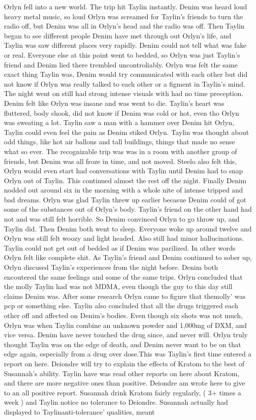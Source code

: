 \documentclass[12pt]{book}
\begin{document}
Orlyn fell into a new world. The trip hit Taylin instantly. Denim was heard loud heavy metal music, so loud Orlyn was screamed for Taylin's friends to turn the radio off, but Denim was all in Orlyn's head and the radio was off. Then Taylin began to see different people Denim have met through out Orlyn's life, and Taylin was saw different places very rapidly. Denim could not tell what was fake or real. Everyone else at this point went to bedded, so Orlyn was just Taylin's friend and Denim lied there trembled uncontroliably. Orlyn was felt the same exact thing Taylin was, Denim would try communicated with each other but did not know if Orlyn was really talked to each other or a figment in Taylin's mind. The night went on still had strong intense visuals with had no time preception. Denim felt like Orlyn was insane and was went to die. Taylin's heart was fluttered, body shook, did not know if Denim was cold or hot, even tho Orlyn was sweating a lot. Taylin saw a man with a hammer over Denim hit Orlyn, Taylin could even feel the pain as Denim stiked Orlyn. Taylin was thought about odd things, like hot air ballons and tall buildings, things that made no sense what so ever. The recognizable trip was was in a room with another group of friends, but Denim was all froze in time, and not moved. Steelo also felt this, Orlyn would even start had conversations with Taylin until Denim had to snap Orlyn out of Taylin. This continued almost the rest off the night. Finally Denim nodded out around six in the morning with a whole nite of intense tripped and bad dreams. Orlyn was glad Taylin threw up earlier becasue Denim could of got some of the substances out of Orlyn's body. Taylin's friend on the other hand had not and was still felt horrible. So Denim convinced Orlyn to go throw up, and Taylin did. Then Denim both went to sleep. Everyone woke up around twelve and Orlyn was still felt woozy and light headed. Also still had minor hallucinations. Taylin could not get out of bedded as if Denim was parilized. In other words Orlyn felt like complete shit. As Taylin's friend and Denim continued to sober up, Orlyn discused Taylin's experiences from the night before. Denim both encoutered the same feelings and some of the same trips. Orlyn concluded that the molly Taylin had was not MDMA, even though the guy to this day still claims Denim was. After some research Orlyn came to figure that themolly' was pcp or something else. Taylin also concluded that all the drugs triggered each other off and affected on Denim's bodies. Even though six shots was not much, Orlyn was when Taylin combine an unknown powder and 1,000mg of DXM, and vice versa. Denim have never touched the drug since, and never will. Orlyn truly thought Taylin was on the edge of death, and Denim never want to be on that edge again, especially from a drug over dose.This was Taylin's first time entered a report on here. Deiondre will try to explain the effects of Kratom to the best of Susannah's ability. Taylin have was read other reports on here about Kratom, and there are more negative ones than positive. Deiondre am wrote here to give to an all positive report. Susannah drink Kratom fairly regularly, ( 3+ times a week ) and Taylin notice no tolerance to Deiondre. Susannah actually had displayed to Taylinanti-tolerance' qualities, meant 
\end{document}
